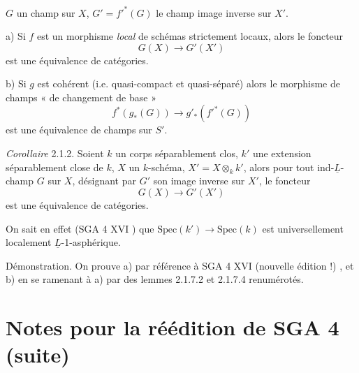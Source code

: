\documentclass[11pt,a4paper]{article}
\begin{document}


$G$ un champ sur $X$, $G' = f'^{*}(G)$ le champ image
inverse sur $X'$.

a) Si $f$ est un morphisme \emph{local} de schémas strictement locaux, alors le
foncteur
\[
G(X) \longrightarrow G'(X')
\]
est une équivalence de catégories.

b) Si $g$ est cohérent (i.e. quasi-compact et quasi-séparé) alors le morphisme
de champs « de changement de base »
\[
f^{*}(g_{*}(G)) \longrightarrow g'_{*}(f'^{*}(G))
\]
est une équivalence de champs sur $S'$.

\emph{Corollaire} 2.1.2. Soient $k$ un corps séparablement clos, $k'$ une
extension séparablement close de $k$, $X$ un $k$-schéma, $X' = X \otimes_k k'$,
alors pour tout ind-$\underline{L}$-champ $G$ sur $X$, désignant par $G'$ son
image inverse sur $X'$, le foncteur
\[
G(X) \longrightarrow G'(X')
\]
est une équivalence de catégories.

On sait en effet (SGA 4 XVI \quad) que $\mathrm{Spec}(k') \to \mathrm{Spec}(k)$
est universellement localement $\underline{L}$-1-asphérique.

Démonstration. On prouve a) par référence à SGA 4 XVI (nouvelle édition !)
, et b) en se ramenant à a) par des lemmes 2.1.7.2 et
2.1.7.4 renumérotés. 

\section*{Notes pour la réédition de SGA 4 (suite)}


\end{document}
